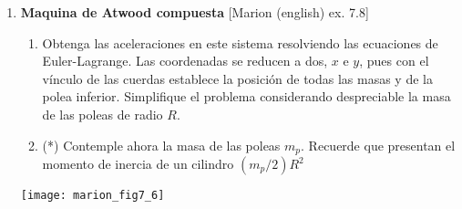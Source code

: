 \documentclass[11pt, spanish, a4paper, twoside]{article}
\begin{document}
\begin{enumerate}
\item
\begin{minipage}[t][6cm]{0.6\textwidth}
\textbf{Maquina de Atwood compuesta} [Marion (english) ex. 7.8]\\ 
\begin{enumerate}
	\item Obtenga las aceleraciones en este sistema resolviendo las ecuaciones de Euler-Lagrange.
	Las coordenadas se reducen a dos, \(x\) e \(y\), pues con el vínculo de las cuerdas establece la posición de todas las masas y de la polea inferior.
	Simplifique el problema considerando despreciable la masa de las poleas de radio \(R\).
	\item (*) Contemple ahora la masa de las poleas \(m_p\).
	Recuerde que presentan el momento de inercia de un cilindro \((m_p/2) R^2\)
\end{enumerate}
\end{minipage}
\begin{minipage}[c][0.5em][t]{0.3\textwidth}
	\texttt{[image: marion\_fig7\_6]}
\end{minipage}



\end{enumerate}
\end{document}
